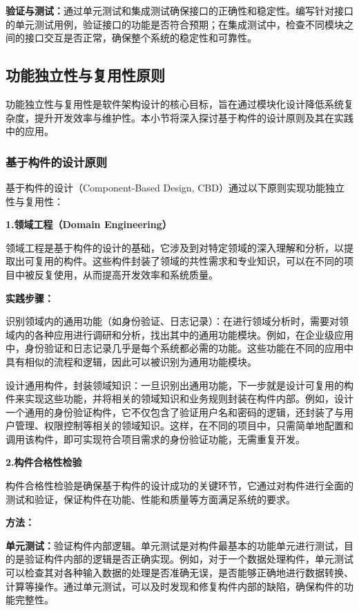 \textbf{验证与测试：}通过单元测试和集成测试确保接口的正确性和稳定性。编写针对接口的单元测试用例，验证接口的功能是否符合预期；在集成测试中，检查不同模块之间的接口交互是否正常，确保整个系统的稳定性和可靠性。

\subsection{功能独立性与复用性原则}

功能独立性与复用性是软件架构设计的核心目标，旨在通过模块化设计降低系统复杂度，提升开发效率与维护性。本小节将深入探讨基于构件的设计原则及其在实践中的应用。

\subsubsection{基于构件的设计原则}

基于构件的设计（Component-Based Design, CBD）通过以下原则实现功能独立性与复用性：

\textbf{1.领域工程（Domain Engineering）}

领域工程是基于构件的设计的基础，它涉及到对特定领域的深入理解和分析，以提取出可复用的构件。这些构件封装了领域的共性需求和专业知识，可以在不同的项目中被反复使用，从而提高开发效率和系统质量。

\textbf{实践步骤：}

识别领域内的通用功能（如身份验证、日志记录）：在进行领域分析时，需要对领域内的各种应用进行调研和分析，找出其中的通用功能模块。例如，在企业级应用中，身份验证和日志记录几乎是每个系统都必需的功能。这些功能在不同的应用中具有相似的流程和逻辑，因此可以被识别为通用功能模块。

设计通用构件，封装领域知识：一旦识别出通用功能，下一步就是设计可复用的构件来实现这些功能，并将相关的领域知识和业务规则封装在构件内部。例如，设计一个通用的身份验证构件，它不仅包含了验证用户名和密码的逻辑，还封装了与用户管理、权限控制等相关的领域知识。这样，在不同的项目中，只需简单地配置和调用该构件，即可实现符合项目需求的身份验证功能，无需重复开发。

\textbf{2.构件合格性检验}

构件合格性检验是确保基于构件的设计成功的关键环节，它通过对构件进行全面的测试和验证，保证构件在功能、性能和质量等方面满足系统的要求。

\textbf{方法：}

\textbf{单元测试：}验证构件内部逻辑。单元测试是对构件最基本的功能单元进行测试，目的是验证构件内部的逻辑是否正确实现。例如，对于一个数据处理构件，单元测试可以检查其对各种输入数据的处理是否准确无误，是否能够正确地进行数据转换、计算等操作。通过单元测试，可以及时发现和修复构件内部的缺陷，确保构件的功能完整性。

